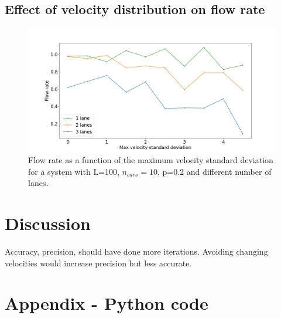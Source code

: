 \documentclass[a4paper,12pt]{article}
\begin{document}
\subsection{Effect of velocity distribution on flow rate}

\begin{figure}[H]
	\centering
        \includegraphics[scale=0.45]{fig10.png}
    \caption{Flow rate as a function of the maximum velocity standard deviation for a system with L=100, $n_{cars}=10$, p=0.2 and different number of lanes.}
    \label{fig10}
\end{figure}


\section*{Discussion}
Accuracy, precision, should have done more iterations. Avoiding changing velocities would increase precision but less accurate. 


\section{Appendix - Python code}



 
\end{document}
